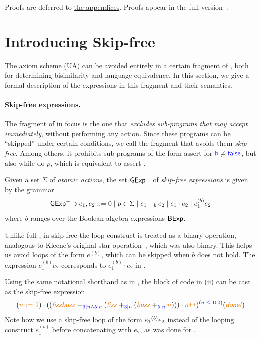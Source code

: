 \documentclass[orivec,envcountsect,envcountsame]{llncs}
\begin{document}
    \ifarxiv%
    Proofs are deferred to \hyperref[appendices]{the appendices}.
    \else%
    Proofs appear in the full version~\cite{fullversion}.
    \fi%

\section{Introducing Skip-free  \GKAT}\label{sec:skipfree}
    The axiom scheme (\textsf{UA}) can be avoided entirely in a certain fragment of  \GKAT, both for determining bisimilarity and language equivalence.
    In this section, we give a formal description of the expressions in this fragment and their semantics.

    \paragraph*{\bf Skip-free expressions.}
    The fragment of \GKAT in focus is the one that \emph{excludes sub-programs that may accept immediately}, without performing any action.
    Since these programs can be ``skipped'' under certain conditions, we call the fragment that avoids them \emph{skip-free}.
    Among others, it prohibits sub-programs of the form {\sffamily assert } for $\textsf{\color{blue}b} \neq \textsf{\color{blue}false}$, but also {\sffamily while  do $p$}, which is equivalent to {\sffamily assert }.

    \begin{definition}
        Given a set \(\Sigma\) of \emph{atomic actions}, the set \(\mathsf{GExp}^-\) of \emph{skip-free \GKAT expressions} is given by the grammar
        \[
            \mathsf{GExp}^- \ni e_1, e_2 ::= 0 \mid p \in \Sigma \mid e_1 +_b e_2 \mid e_1\cdot e_2 \mid e_1^{(b)} e_2
        \]
        where \(b\) ranges over the Boolean algebra expressions \(\mathsf{BExp}\).
    \end{definition}

    Unlike full \GKAT, in skip-free \GKAT the loop construct is treated as a binary operation, analogous to Kleene's original star operation~\cite{kleene}, which was also binary.
    This helps us avoid loops of the form $e^{(b)}$, which can be skipped when $b$ does not hold.
    The expression \(e_1 ^{(b)} e_2\) corresponds to \(e_1 ^{(b)} \cdot e_2\) in  \GKAT. %

    \begin{example}\label{eg:example expression}
        Using the same notational shorthand as in , the block of code in (ii) can be cast as the skip-free \GKAT expression %
        \[
            (\action{$n$ := 1}) \cdot ((\action{\textit{fizzbuzz}} +_{\test{$3|n$} \wedge \test{$5|n$}} (\action{\textit{fizz}} +_{\test{$3|n$}} (\action{\textit{buzz}} +_{\test{$5|n$}} \action{$n$}))) \cdot \action{$n$\texttt{++}})^{(\test{$n \leq 100$})} (\action{\textit{done!}}) %
        \]
        Note how we use a skip-free loop of the form $e_1 {\mathbin{^{(b)}}} e_2$ instead of the looping construct $e_1^{(b)}$ before concatenating with $e_2$, as was done for \GKAT. %
    \end{example}
\end{document}
